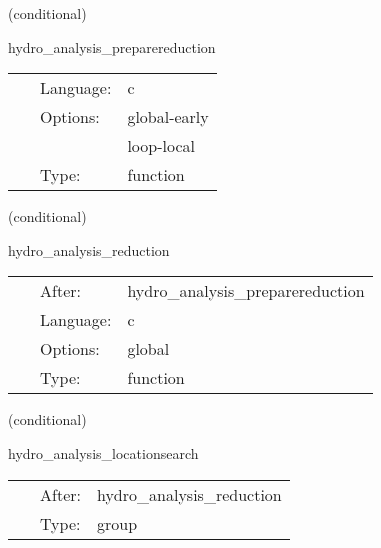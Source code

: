 \vspace{5mm}

   (conditional) 

\hspace{5mm} hydro\_analysis\_preparereduction 

\hspace{5mm}{\it compute the local reduction results } 


\hspace{5mm}

 \begin{tabular*}{160mm}{cll} 
~ & Language:  & c \\ 
~ & Options:  & global-early \\ 
~& ~ &loop-local\\ 
~ & Type:  & function \\ 
\end{tabular*} 


\vspace{5mm}

   (conditional) 

\hspace{5mm} hydro\_analysis\_reduction 

\hspace{5mm}{\it compute the global reduction results } 


\hspace{5mm}

 \begin{tabular*}{160mm}{cll} 
~ & After:  & hydro\_analysis\_preparereduction \\ 
~ & Language:  & c \\ 
~ & Options:  & global \\ 
~ & Type:  & function \\ 
\end{tabular*} 


\vspace{5mm}

   (conditional) 

\hspace{5mm} hydro\_analysis\_locationsearch 

\hspace{5mm}{\it look for the location of the maximum density } 


\hspace{5mm}

 \begin{tabular*}{160mm}{cll} 
~ & After:  & hydro\_analysis\_reduction \\ 
~ & Type:  & group \\ 
\end{tabular*} 


